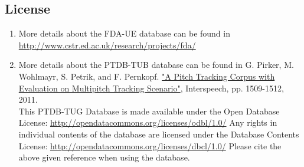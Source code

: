\documentclass[a4paper,11pt]{article}
\begin{document}
\subsection*{License}
\begin{enumerate}
\item More details about the FDA-UE database can be found in \url{http://www.cstr.ed.ac.uk/research/projects/fda/}
\item More details about the PTDB-TUB database can be found in G. Pirker, M. Wohlmayr, S. Petrik, and F. Pernkopf. \href{https://www.spsc.tugraz.at/system/files/InterSpeech2011Master_0.pdf}{"A Pitch Tracking Corpus with Evaluation on Multipitch Tracking Scenario"}, Interspeech, pp. 1509-1512, 2011.\\
This PTDB-TUG Database is made available under the Open Database License: \url{http://opendatacommons.org/licenses/odbl/1.0/} Any rights in individual contents of the database are licensed under the Database Contents License: \url{http://opendatacommons.org/licenses/dbcl/1.0/} Please cite the above given reference when using the database. 
\end{enumerate}
\end{document}
